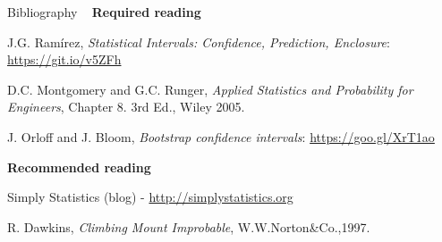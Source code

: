 \documentclass[t]{beamer}
\begin{document}


\begin{ftst}
{Bibliography}
{\ }
\scriptsize
\textbf{Required reading}

\benums J.G. Ram\'irez, \textit{Statistical Intervals: Confidence, Prediction, Enclosure}: \url{https://git.io/v5ZFh}
\item D.C. Montgomery and G.C. Runger, \textit{Applied Statistics and Probability for Engineers}, Chapter 8. 3rd Ed., Wiley 2005.
\item J. Orloff and J. Bloom, \textit{Bootstrap confidence intervals}: \url{https://goo.gl/XrT1ao}
\eenum

\textbf{Recommended reading}

\benums Simply Statistics (blog) - \url{http://simplystatistics.org}
\item R. Dawkins, \textit{Climbing Mount Improbable}, W.W.Norton\&Co.,1997.
\eenum
\end{ftst}



\end{document}
